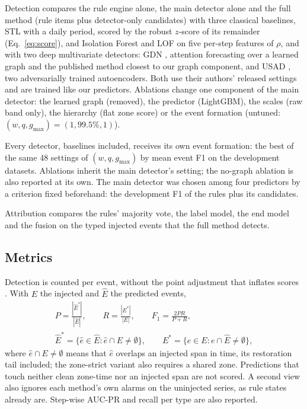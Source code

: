 Detection compares the rule engine alone, the main detector alone and the full method (rule items plus detector-only candidates) with three classical baselines, STL \cite{cleveland1990stl,seabold2010statsmodels} with a daily period, scored by the robust $z$-score of its remainder (Eq.~\eqref{eq:score}), and Isolation Forest \cite{liu2008iforest} and LOF \cite{breunig2000lof} on five per-step features of $\rho$, and with two deep multivariate detectors: GDN \cite{deng2021gdn}, attention forecasting over a learned graph and the published method closest to our graph component, and USAD \cite{audibert2020usad}, two adversarially trained autoencoders. Both use their authors' released settings and are trained like our predictors. Ablations change one component of the main detector: the learned graph (removed), the predictor (LightGBM), the scales (raw band only), the hierarchy (flat zone score) or the event formation (untuned: $(w, q, g_{\max}) = (1, 99.5\%, 1)$).

Every detector, baselines included, receives its own event formation: the best of the same 48 settings of $(w, q, g_{\max})$ by mean event F1 on the development datasets. Ablations inherit the main detector's setting; the no-graph ablation is also reported at its own. The main detector was chosen among four predictors by a criterion fixed beforehand: the development F1 of the rules plus its candidates.

Attribution compares the rules' majority vote, the label model, the end model and the fusion on the typed injected events that the full method detects.

\subsection{Metrics}\label{sec:metrics}

Detection is counted per event, without the point adjustment that inflates scores \cite{kim2022rigorous}. With $E$ the injected and $\hat{E}$ the predicted events,
\begin{equation}
\begin{gathered}
P = \frac{|\hat{E}^{*}|}{|\hat{E}|}, \qquad R = \frac{|E^{*}|}{|E|}, \qquad F_1 = \frac{2PR}{P + R}, \\
\hat{E}^{*} = \{\hat{e} \in \hat{E} : \hat{e} \cap E \neq \emptyset\}, \qquad E^{*} = \{e \in E : e \cap \hat{E} \neq \emptyset\},
\end{gathered}
\label{eq:eventf1}
\end{equation}
where $\hat{e} \cap E \neq \emptyset$ means that $\hat{e}$ overlaps an injected span in time, its restoration tail included; the zone-strict variant also requires a shared zone. Predictions that touch neither clean zone-time nor an injected span are not scored. A second view also ignores each method's own alarms on the uninjected series, as rule states already are. Step-wise AUC-PR and recall per type are also reported.

